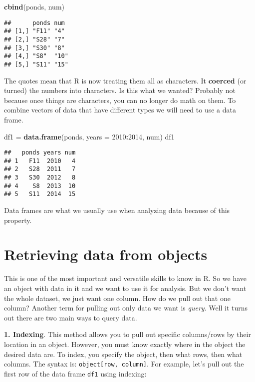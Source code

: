 \documentclass[]{book}
\newenvironment{Shaded}{\begin{snugshade}}{\end{snugshade}}
\newcommand{\KeywordTok}[1]{\textcolor[rgb]{0.13,0.29,0.53}{\textbf{#1}}}
\newcommand{\DataTypeTok}[1]{\textcolor[rgb]{0.13,0.29,0.53}{#1}}
\newcommand{\DecValTok}[1]{\textcolor[rgb]{0.00,0.00,0.81}{#1}}
\newcommand{\StringTok}[1]{\textcolor[rgb]{0.31,0.60,0.02}{#1}}
\newcommand{\OperatorTok}[1]{\textcolor[rgb]{0.81,0.36,0.00}{\textbf{#1}}}
\newcommand{\NormalTok}[1]{#1}
\theoremstyle{definition}
\theoremstyle{definition}
\theoremstyle{definition}
\theoremstyle{remark}
\begin{document}
\begin{Shaded}
\begin{Highlighting}[]
\KeywordTok{cbind}\NormalTok{(ponds, num)}
\end{Highlighting}
\end{Shaded}

\begin{verbatim}
##      ponds num 
## [1,] "F11" "4" 
## [2,] "S28" "7" 
## [3,] "S30" "8" 
## [4,] "S8"  "10"
## [5,] "S11" "15"
\end{verbatim}

The quotes mean that R is now treating them all as characters. It
\textbf{coerced} (or turned) the numbers into characters. Is this what
we wanted? Probably not because once things are characters, you can no
longer do math on them. To combine vectors of data that have different
types we will need to use a data frame.

\begin{Shaded}
\begin{Highlighting}[]
\NormalTok{df1 =}\StringTok{ }\KeywordTok{data.frame}\NormalTok{(ponds, }\DataTypeTok{years =} \DecValTok{2010}\OperatorTok{:}\DecValTok{2014}\NormalTok{, num)}
\NormalTok{df1}
\end{Highlighting}
\end{Shaded}

\begin{verbatim}
##   ponds years num
## 1   F11  2010   4
## 2   S28  2011   7
## 3   S30  2012   8
## 4    S8  2013  10
## 5   S11  2014  15
\end{verbatim}

Data frames are what we usually use when analyzing data because of this
property.

\chapter{Retrieving data from
objects}\label{retrieving-data-from-objects}

This is one of the most important and versatile skills to know in R. So
we have an object with data in it and we want to use it for analysis.
But we don't want the whole dataset, we just want one column. How do we
pull out that one column? Another term for pulling out only data we want
is \emph{query}. Well it turns out there are two main ways to query
data.

\textbf{1. Indexing}. This method allows you to pull out specific
columns/rows by their location in an object. However, you must know
exactly where in the object the desired data are. To index, you specify
the object, then what rows, then what columns. The syntax is:
\texttt{object{[}row,\ column{]}}. For example, let's pull out the first
row of the data frame \texttt{df1} using indexing:
\end{document}
